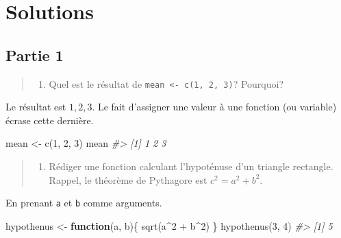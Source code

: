 \documentclass[
]{book}
\newenvironment{Shaded}{}{}
\newcommand{\CommentTok}[1]{\textit{#1}}
\newcommand{\ControlFlowTok}[1]{\textbf{#1}}
\newcommand{\DecValTok}[1]{#1}
\newcommand{\FunctionTok}[1]{#1}
\newcommand{\NormalTok}[1]{#1}
\newcommand{\OtherTok}[1]{#1}
\newcommand{\SpecialCharTok}[1]{#1}
\providecommand{\tightlist}{%
  \setlength{\itemsep}{0pt}\setlength{\parskip}{0pt}}
\begin{document}
\hypertarget{solutions}{%
\chapter*{Solutions}\label{solutions}}

\hypertarget{partie-1}{%
\section*{Partie 1}\label{partie-1}}

\begin{quote}
\begin{enumerate}
\def\labelenumi{\arabic{enumi}.}
\tightlist
\item
  Quel est le résultat de \texttt{mean\ \textless{}-\ c(1,\ 2,\ 3)}? Pourquoi?
\end{enumerate}
\end{quote}

Le résultat est \(1, 2, 3\). Le fait d'assigner une valeur à une fonction (ou variable) écrase cette dernière.

\begin{Shaded}
\begin{Highlighting}[]
\NormalTok{mean }\OtherTok{\textless{}{-}} \FunctionTok{c}\NormalTok{(}\DecValTok{1}\NormalTok{, }\DecValTok{2}\NormalTok{, }\DecValTok{3}\NormalTok{)}
\NormalTok{mean}
\CommentTok{\#\textgreater{} [1] 1 2 3}
\end{Highlighting}
\end{Shaded}

\begin{quote}
\begin{enumerate}
\def\labelenumi{\arabic{enumi}.}
\setcounter{enumi}{1}
\tightlist
\item
  Rédiger une fonction calculant l'hypoténuse d'un triangle rectangle. Rappel, le théorème de Pythagore est \(c^2=a^2+b^2\).
\end{enumerate}
\end{quote}

En prenant \texttt{a} et \texttt{b} comme arguments.

\begin{Shaded}
\begin{Highlighting}[]
\NormalTok{hypothenus }\OtherTok{\textless{}{-}} \ControlFlowTok{function}\NormalTok{(a, b)\{}
  \FunctionTok{sqrt}\NormalTok{(a}\SpecialCharTok{\^{}}\DecValTok{2} \SpecialCharTok{+}\NormalTok{ b}\SpecialCharTok{\^{}}\DecValTok{2}\NormalTok{)}
\NormalTok{\}}
\FunctionTok{hypothenus}\NormalTok{(}\DecValTok{3}\NormalTok{, }\DecValTok{4}\NormalTok{)}
\CommentTok{\#\textgreater{} [1] 5}
\end{Highlighting}
\end{Shaded}
\end{document}
